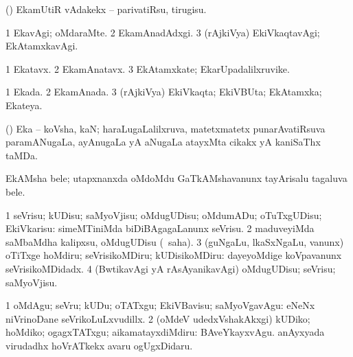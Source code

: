 {{\bentry
{} 
\gl{\sakirx}
\expl{}
\bmng
(\kerxY) EkamUtiR vAdakekx -- parivatiRsu, tirugisu. 
\emng
\eentry

\bentry
{} 
\gl{\kirxvi}
\bmng
\bnum
\num{1} EkavAgi; oMdaraMte. 
\num{2} EkamAnadAdxgi. 
\num{3} (rAjkiVya) EkiVkaqtavAgi; EkAtamxkavAgi. 
\enum
\emng
\eentry

\bentry
{} 
\gl{\nA}
\expl{}
\bmng
\bnum
\num{1} Ekatavx. 
\num{2} EkamAnatavx. 
\num{3} EkAtamxkate; EkarUpadalilxruvike. 
\enum
\emng
\eentry

\bentry
{} 
\gl{\gu}
\bmng
\bnum
\num{1} Ekada. 
\num{2} EkamAnada. 
\num{3} (rAjkiVya) EkiVkaqta; EkiVBUta; EkAtamxka; Ekateya. 
\enum
\emng
\eentry

\bentry
{}
\gl{\nA}
\expl{}
\bmng
(\saPxvi) Eka -- koVsha, kaN; haraLugaLalilxruva, matetxmatetx punarAvatiRsuva paramANugaLa, ayAnugaLa yA aNugaLa atayxMta cikakx yA kaniSaThx taMDa. 
\emng
\eentry

\bentry
{}
\gl{\nA}
\expl{}
\bmng
EkAMsha bele; utapxnanxda oMdoMdu GaTkAMshavanunx tayArisalu tagaluva bele. 
\emng
\eentry

\bentry
{} 
\gl{\sakirx}
\expl{}
\bmng
\bnum
\num{1} seVrisu; kUDisu; saMyoVjisu; oMdugUDisu; oMdumADu; oTuTxgUDisu; EkiVkarisu:  simeMTiniMda biDiBAgagaLanunx seVrisu. 
\num{2} maduveyiMda saMbaMdha kalipxsu, oMdugUDisu (\akirx\ saha). 
\num{3} (guNgaLu, lkaSxNgaLu, \mo vanunx) oTiTxge hoMdiru; seVrisikoMDiru; kUDisikoMDiru:  dayeyoMdige koVpavanunx seVrisikoMDidadx. 
\num{4} (BwtikavAgi yA rAsAyanikavAgi) oMdugUDisu; seVrisu; saMyoVjisu. 
\enum
\emng

\noindent
\gl{\akirx}
\expl{}
\bmng
\bnum
\num{1} oMdAgu; seVru; kUDu; oTATxgu; EkiVBavisu; saMyoVgavAgu:  eNeNx niVrinoDane seVrikoLuLxvudillx. 
\num{2} (oMdeV udedxVshakAkxgi) kUDiko; hoMdiko; ogagxTATxgu; aikamatayxdiMdiru:  BAveYkayxvAgu.  anAyxyada virudadhx hoVrATkekx avaru ogUgxDidaru. 
\enum
\emng
\eentry

\bentry
{}
\gl{\nA}
\expl{}
\bmng
{} 
\emng
\eentry

}}

